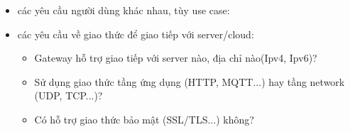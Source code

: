\begin{itemize}
\begin{itemize}
        \subsection*{3. Giao Thức Ứng Dụng (Application Protocols)}
        \begin{itemize}
            \item \textbf{AT Command (tập lệnh AT):}
            \begin{itemize}
                \item Nhiều module modem, cảm biến dùng tập lệnh AT để cấu hình, điều khiển, truy vấn trạng thái.
                \item Gateway phải tích hợp parser để gửi/nhận và xử lý tập lệnh AT.
            \end{itemize}
            \item \textbf{Custom Protocols:}
            \begin{itemize}
                \item Một số thiết bị sử dụng giao thức tự định nghĩa, cần mapping hoặc scripting để gateway hiểu và chuyển đổi dữ liệu.
            \end{itemize}
            \item \textbf{MQTT, CoAP, HTTP (nếu cảm biến thông minh):}
            \begin{itemize}
                \item Một số thiết bị hiện đại tích hợp sẵn giao thức tầng ứng dụng, cho phép giao tiếp trực tiếp với gateway qua mạng IP.
            \end{itemize}
        \end{itemize}
        \begin{itemize}
            \item Kết nối các thiết bị IoT với mạng nội bộ hoặc internet.
        \end{itemize}
        \item các yêu cầu người dùng khác nhau, tùy use case:
        \item các yêu cầu về giao thức để giao tiếp với server/cloud:
        \begin{itemize}
            \item Gateway hỗ trợ giao tiếp với server nào, địa chỉ nào(Ipv4, Ipv6)?
            \item Sử dụng giao thức tầng ứng dụng (HTTP, MQTT...) hay tầng network (UDP, TCP...)?
            \item Có hỗ trợ giao thức bảo mật (SSL/TLS...) không?
        \end{itemize}

\end{itemize}
\end{itemize}
